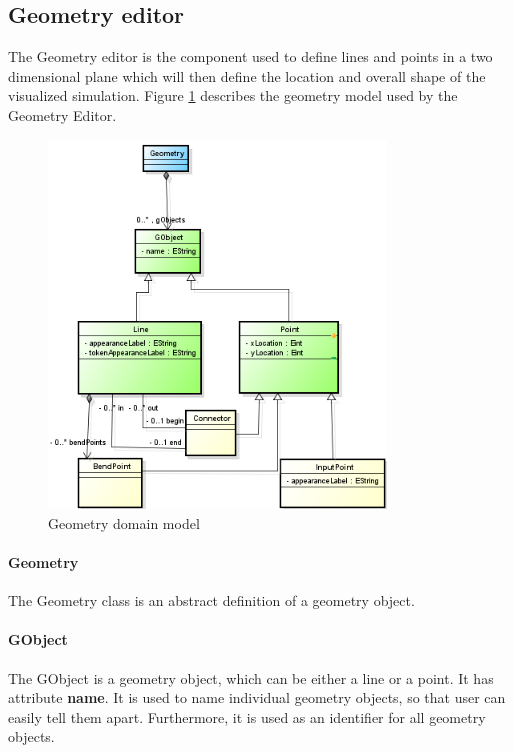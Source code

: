 \subsection{Geometry editor}
\label{sec:arch-geometry}

The Geometry editor is the component used to define lines and points in a two dimensional plane which will then define the location and overall shape of the visualized simulation. Figure \ref{fig:model-geometry} describes the geometry model used by the Geometry Editor.

\begin{figure}[htp]
\begin{center}
  \includegraphics[width=0.8\textwidth]{image/geometry_diagram.png}
  \caption{Geometry domain model}
  \label{fig:model-geometry}
\end{center}
\end{figure}

\paragraph{Geometry}
The Geometry class is an abstract definition of a geometry object.

\paragraph{GObject}
The GObject is a geometry object, which can be either a line or a point. It has attribute \textbf{name}. It is used to name individual geometry objects, so that user can easily tell them apart. Furthermore, it is used as an identifier for all geometry objects.

